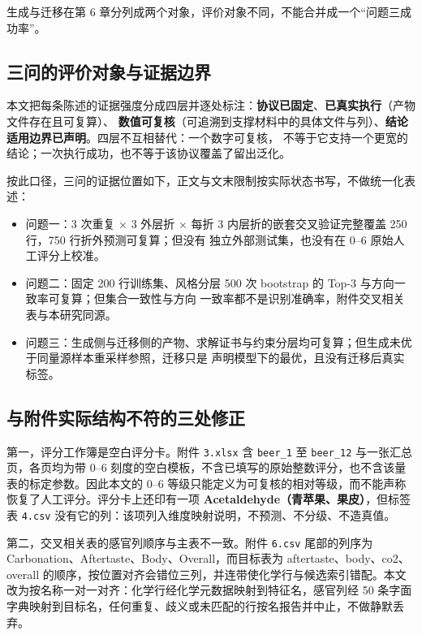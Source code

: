 \documentclass[11pt,a4paper]{article}
\providecommand{\tightlist}{%
  \setlength{\itemsep}{0pt}\setlength{\parskip}{0pt}}
\begin{document}
生成与迁移在第 6
章分列成两个对象，评价对象不同，不能合并成一个``问题三成功率''。

\subsection{三问的评价对象与证据边界}\label{ux4e09ux95eeux7684ux8bc4ux4ef7ux5bf9ux8c61ux4e0eux8bc1ux636eux8fb9ux754c}

本文把每条陈述的证据强度分成四层并逐处标注：\textbf{协议已固定}、\textbf{已真实执行}（产物文件存在且可复算）、
\textbf{数值可复核}（可追溯到支撑材料中的具体文件与列）、\textbf{结论适用边界已声明}。四层不互相替代：一个数字可复核，
不等于它支持一个更宽的结论；一次执行成功，也不等于该协议覆盖了留出泛化。

按此口径，三问的证据位置如下，正文与文末限制按实际状态书写，不做统一化表述：

\begin{itemize}
\tightlist
\item
  问题一：3 次重复 × 3 外层折 × 每折 3 内层折的嵌套交叉验证完整覆盖 250
  行，750 行折外预测可复算；但没有 独立外部测试集，也没有在 0--6
  原始人工评分上校准。
\item
  问题二：固定 200 行训练集、风格分层 500 次 bootstrap 的 Top-3
  与方向一致率可复算；但集合一致性与方向
  一致率都不是识别准确率，附件交叉相关表与本研究同源。
\item
  问题三：生成侧与迁移侧的产物、求解证书与约束分层均可复算；但生成未优于同量源样本重采样参照，迁移只是
  声明模型下的最优，且没有迁移后真实标签。
\end{itemize}

\subsection{与附件实际结构不符的三处修正}\label{ux4e0eux9644ux4ef6ux5b9eux9645ux7ed3ux6784ux4e0dux7b26ux7684ux4e09ux5904ux4feeux6b63}

第一，评分工作簿是空白评分卡。附件 \texttt{3.xlsx} 含 \texttt{beer\_1}
至 \texttt{beer\_12} 与一张汇总页，各页均为带 0--6
刻度的空白模板，不含已填写的原始整数评分，也不含该量表的标定参数。因此本文的
0--6
等级只能定义为可复核的相对等级，而不能声称恢复了人工评分。评分卡上还印有一项
\textbf{Acetaldehyde（青苹果、果皮）}，但标签表 \texttt{4.csv}
没有它的列：该项列入维度映射说明，不预测、不分级、不造真值。

第二，交叉相关表的感官列顺序与主表不一致。附件 \texttt{6.csv}
尾部的列序为 Carbonation、Aftertaste、Body、Overall，而目标表为
aftertaste、body、co2、overall
的顺序，按位置对齐会错位三列，并连带使化学行与候选索引错配。本文改为按名称一对一对齐：化学行经化学元数据映射到特征名，感官列经
50
条字面字典映射到目标名，任何重复、歧义或未匹配的行按名报告并中止，不做静默丢弃。
\end{document}
